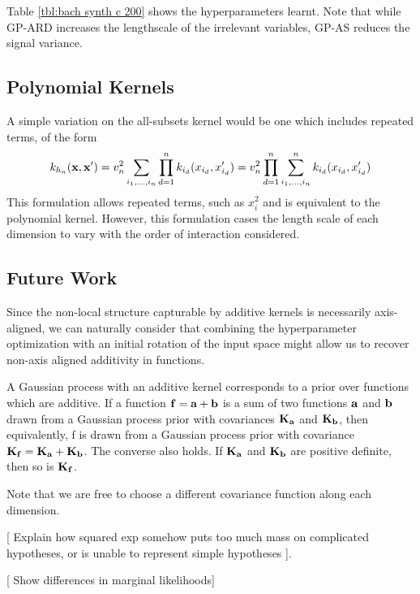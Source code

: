 

Table \ref{tbl:bach synth c 200} shows the hyperparameters learnt.  Note that while GP-ARD increases the lengthscale of the irrelevant variables, GP-AS reduces the signal variance.
 
 
\subsection{Polynomial Kernels}

A simple variation on the all-subsets kernel would be one which includes repeated terms, of the form
\begin{equation}
k_{h_n}({\bf x, x'}) = v_n^2 \sum_{i_1, \dots, i_n} \prod_{d=1}^n k_{i_d}(x_{i_d}, x_{i_d}') = v_n^2 \prod_{d=1}^n \sum_{i_1, \dots, i_n}^n k_{i_d}(x_{i_d}, x_{i_d}')
\end{equation}
This formulation allows repeated terms, such as $x_i^2$ and is equivalent to the polynomial kernel\cite{shawe2004kernel}.  However, this formulation cases the length scale of each dimension to vary with the order of interaction considered.


\subsection{Future Work}
Since the non-local structure capturable by additive kernels is necessarily axis-aligned, we can naturally consider that combining the hyperparameter optimization with an initial rotation of the input space might allow us to recover non-axis aligned additivity in functions.


A Gaussian process with an additive kernel corresponds to a prior over functions which are additive.
If a function $\bf{f} = \bf{a} + \bf{b}$ is a sum of two functions $\bf a$ and $\bf b$ drawn from a Gaussian process prior with covariances $\bf K_a$ and $\bf K_b$, then equivalently, f is drawn from a Gaussian process prior with covariance $\bf K_f = \bf K_a + \bf K_b$.  The converse also holds.  If $\bf K_a$ and $\bf K_b$ are positive definite, then so is $\bf K_f$.


Note that we are free to choose a different covariance function along each dimension.

[ Explain how squared exp somehow puts too much mass on complicated hypotheses, or is unable to represent simple hypotheses ].

[ Show differences in marginal likelihoods]

